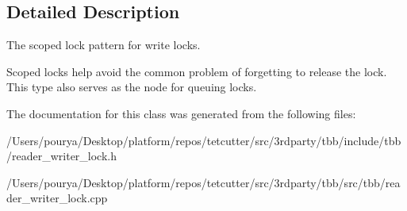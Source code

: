 \subsection{Detailed Description}
The scoped lock pattern for write locks. 

Scoped locks help avoid the common problem of forgetting to release the lock. This type also serves as the node for queuing locks. 

The documentation for this class was generated from the following files\+:\begin{DoxyCompactItemize}
\item 
/\+Users/pourya/\+Desktop/platform/repos/tetcutter/src/3rdparty/tbb/include/tbb/reader\+\_\+writer\+\_\+lock.\+h\item 
/\+Users/pourya/\+Desktop/platform/repos/tetcutter/src/3rdparty/tbb/src/tbb/reader\+\_\+writer\+\_\+lock.\+cpp\end{DoxyCompactItemize}
